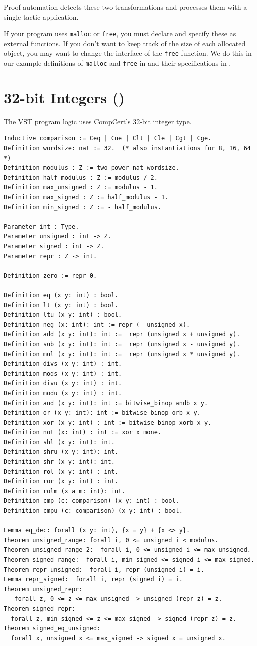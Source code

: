 \documentclass[12pt,fleqn,openany,oneside,showtrims]{memoir}
\newcommand{\ychapter}[2]{\chapter[#1]{#1 \hfill \normalsize #2}}
\begin{document}
Proof automation detects these two transformations and processes them with a
single tactic application.

If your program uses \lstinline|malloc| or \lstinline|free|, you must declare
and specify these as external functions. If you don't want to keep track of the
size of each allocated object, you may want to change the interface of the
\lstinline|free| function. We do this in our example definitions of
\lstinline|malloc| and \lstinline|free| in  and their
specifications in .

\ychapter{32-bit Integers}{()}

The VST program logic uses CompCert's 32-bit integer type.

\begin{lstlisting}
Inductive comparison := Ceq | Cne | Clt | Cle | Cgt | Cge.
Definition wordsize: nat := 32.  (* also instantiations for 8, 16, 64 *)
Definition modulus : Z := two_power_nat wordsize.
Definition half_modulus : Z := modulus / 2.
Definition max_unsigned : Z := modulus - 1.
Definition max_signed : Z := half_modulus - 1.
Definition min_signed : Z := - half_modulus.

Parameter int : Type.
Parameter unsigned : int -> Z.
Parameter signed : int -> Z.
Parameter repr : Z -> int.

Definition zero := repr 0.

Definition eq (x y: int) : bool.
Definition lt (x y: int) : bool.
Definition ltu (x y: int) : bool.
Definition neg (x: int): int := repr (- unsigned x).
Definition add (x y: int): int :=  repr (unsigned x + unsigned y).
Definition sub (x y: int): int :=  repr (unsigned x - unsigned y).
Definition mul (x y: int): int :=  repr (unsigned x * unsigned y).
Definition divs (x y: int) : int.
Definition mods (x y: int) : int.
Definition divu (x y: int) : int.
Definition modu (x y: int) : int.
Definition and (x y: int): int := bitwise_binop andb x y.
Definition or (x y: int): int := bitwise_binop orb x y.
Definition xor (x y: int) : int := bitwise_binop xorb x y.
Definition not (x: int) : int := xor x mone.
Definition shl (x y: int): int.
Definition shru (x y: int): int.
Definition shr (x y: int): int.
Definition rol (x y: int) : int.
Definition ror (x y: int) : int.
Definition rolm (x a m: int): int.
Definition cmp (c: comparison) (x y: int) : bool.
Definition cmpu (c: comparison) (x y: int) : bool.

Lemma eq_dec: forall (x y: int), {x = y} + {x <> y}.
Theorem unsigned_range: forall i, 0 <= unsigned i < modulus.
Theorem unsigned_range_2:  forall i, 0 <= unsigned i <= max_unsigned.
Theorem signed_range:  forall i, min_signed <= signed i <= max_signed.
Theorem repr_unsigned:  forall i, repr (unsigned i) = i.
Lemma repr_signed:  forall i, repr (signed i) = i.
Theorem unsigned_repr:
   forall z, 0 <= z <= max_unsigned -> unsigned (repr z) = z.
Theorem signed_repr:
  forall z, min_signed <= z <= max_signed -> signed (repr z) = z.
Theorem signed_eq_unsigned:
  forall x, unsigned x <= max_signed -> signed x = unsigned x.


\end{lstlisting}
\end{document}
